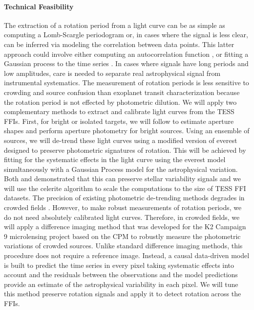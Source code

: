 \documentclass[letterpaper,12pt,preprint]{hack_aastex}
\begin{document}
\paragraph{Technical Feasibility}
The extraction of a rotation period from a light curve can be as simple as
computing a Lomb-Scargle periodogram or, in cases where the signal is less
clear, can be inferred via modeling the correlation between data points.
This latter approach could involve either computing an autocorrelation
function \citep{mcquillan2013}, or fitting a Gaussian process to the time
series \citep{angus2017, foreman-mackey2017}.
In cases where signals have long periods and low amplitudes, care is needed to
separate real astrophysical signal from instrumental systematics.
The measurement of rotation periods is less sensitive to crowding and source
confusion than exoplanet transit characterization because the rotation period
is not effected by photometric dilution.
We will apply two complementary methods to extract and calibrate light curves
from the TESS FFIs.
First, for bright or isolated targets, we will follow \citet{montet2017} to
estimate aperture shapes and perform aperture photometry for bright sources.
Using an ensemble of sources, we will de-trend these light curves using a
modified version of \textsf{everest} \citep{luger2016, luger2017} designed to
preserve photometric signatures of rotation.
This will be achieved by fitting for the systematic effects in the light curve
using the \textsf{everest} model simultaneously with a Gaussian Process model
for the astrophysical variation.
Both \citet{aigrain2016} and \citet{luger2016} demonstrated that this can
preserve stellar variability signals and we will use the \textsf{celerite}
algorithm \citep{dfm2017} to scale the computations to the size of TESS FFI
datasets.
The precision of existing photometric de-trending methods degrades in crowded
fields \citep[for example,][]{luger2017}.
However, to make robust measurements of rotation periods, we do not need
absolutely calibrated light curves.
Therefore, in crowded fields, we will apply a difference imaging method that
was developed for the K2 Campaign 9 microlensing project \citep{henderson2016}
based on the \textsf{CPM} \citep{wang2016} to robustly measure the photometric
variations of crowded sources.
Unlike standard difference imaging methods, this procedure does not require a
reference image.
Instead, a causal data-driven model is built to predict the time series in
every pixel taking systematic effects into account and the residuals between
the observations and the model predictions provide an estimate of the
astrophysical variability in each pixel.
We will tune this method preserve rotation signals and apply it to detect
rotation across the FFIs.
\end{document}
